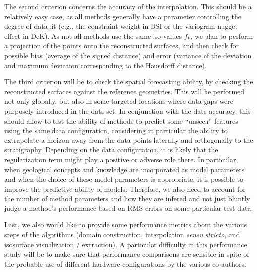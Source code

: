 \documentclass[preprint]{elsarticle}
\begin{document}

The second criterion concerns the accuracy of the interpolation. This should be a relatively easy case, as all methods generally have a parameter controlling the degree of data fit (e.g., the constraint weight in DSI or the variogram nugget effect in DcK). As not all methods use the same iso-values $f_k$, we plan to perform a projection of the points onto the reconstructed surfaces, and then check for possible bias (average of the signed distance) and error (variance of the deviation and maximum deviation corresponding to the Hausdorff distance). 

The third criterion will be to check the spatial forecasting ability, by checking the reconstructed surfaces against the reference geometries. This will be performed not only globally, but also in some targeted locations where data gaps were purposely introduced in the data set. In conjunction with the data accuracy, this should allow to test the ability of methods to predict some ``unseen'' features using the same data configuration, considering in particular the ability to extrapolate a horizon away from the data points laterally and orthogonally to the stratigraphy. Depending on the data configuration, it is likely that the regularization term might play a positive or adverse role there. In particular, when geological concepts and knowledge are incorporated as model parameters \citep[e.g.,][]{Laurent2016EaPSL,Grose2017JSG,Grose2018JGRSE,Grose2019JoSG} and when the choice of these model parameters is appropriate, it is possible to improve the predictive ability of models. Therefore, we also need to account for the number of method parameters and how they are infered and not just bluntly judge a method's performance based on RMS errors on some particular test data.  

Last, we also would like to provide some performance metrics about the various steps of the algorithms (domain construction, interpolation \textit{sensu stricto}, and isosurface visualization / extraction). A particular difficulty in this performance study will be to make sure that performance comparisons are sensible in spite of the probable use of different hardware configurations by the various co-authors. 

 
\end{document}
